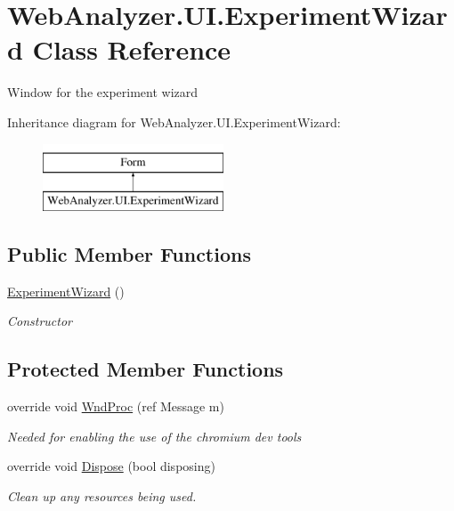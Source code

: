 \hypertarget{class_web_analyzer_1_1_u_i_1_1_experiment_wizard}{}\section{Web\+Analyzer.\+U\+I.\+Experiment\+Wizard Class Reference}
\label{class_web_analyzer_1_1_u_i_1_1_experiment_wizard}


Window for the experiment wizard  


Inheritance diagram for Web\+Analyzer.\+U\+I.\+Experiment\+Wizard\+:\begin{figure}[H]
\begin{center}
\leavevmode
\includegraphics[height=2.000000cm]{class_web_analyzer_1_1_u_i_1_1_experiment_wizard}
\end{center}
\end{figure}
\subsection*{Public Member Functions}
\begin{DoxyCompactItemize}
\item 
\hyperlink{class_web_analyzer_1_1_u_i_1_1_experiment_wizard_adf341f79a31a375235d7afa3abf63030}{Experiment\+Wizard} ()
\begin{DoxyCompactList}\small\item\em Constructor \end{DoxyCompactList}\end{DoxyCompactItemize}
\subsection*{Protected Member Functions}
\begin{DoxyCompactItemize}
\item 
override void \hyperlink{class_web_analyzer_1_1_u_i_1_1_experiment_wizard_a96ad3b4f335a244f83f0c09636523989}{Wnd\+Proc} (ref Message m)
\begin{DoxyCompactList}\small\item\em Needed for enabling the use of the chromium dev tools \end{DoxyCompactList}\item 
override void \hyperlink{class_web_analyzer_1_1_u_i_1_1_experiment_wizard_a15f391a3ce1d14428480cbf98d7ed043}{Dispose} (bool disposing)
\begin{DoxyCompactList}\small\item\em Clean up any resources being used. \end{DoxyCompactList}\end{DoxyCompactItemize}
